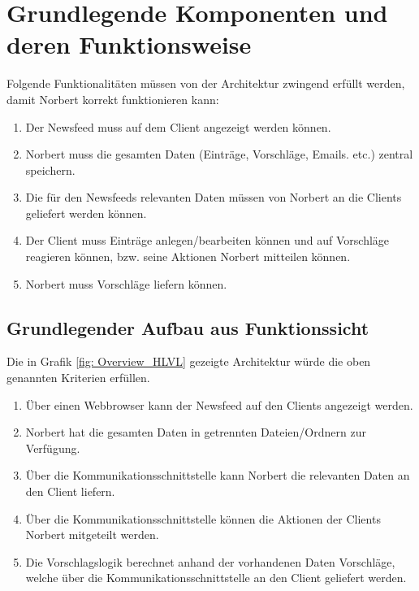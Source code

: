 
\chapter{Grundlegende Komponenten und deren Funktionsweise}

Folgende Funktionalitäten müssen von der Architektur zwingend erfüllt werden, damit Norbert korrekt funktionieren kann:
\begin{enumerate}
	\item Der Newsfeed muss auf dem Client angezeigt werden können.
	\item Norbert muss die gesamten Daten (Einträge, Vorschläge, Emails. etc.) zentral speichern.
	\item Die für den Newsfeeds relevanten Daten müssen von Norbert an die Clients geliefert werden können.
	\item Der Client muss Einträge anlegen/bearbeiten können und auf Vorschläge reagieren können, bzw. seine Aktionen Norbert mitteilen können.
	\item Norbert muss Vorschläge liefern können.
\end{enumerate}
 


\section{Grundlegender Aufbau aus Funktionssicht}


  Die in Grafik \ref{fig: Overview_HLVL} gezeigte Architektur würde die oben genannten Kriterien erfüllen.
  \begin{enumerate}
  	\item Über einen Webbrowser kann der Newsfeed auf den Clients angezeigt werden.
  	\item Norbert hat die gesamten Daten in getrennten Dateien/Ordnern zur Verfügung.
  	\item Über die Kommunikationsschnittstelle kann Norbert die relevanten Daten an den Client liefern.
  	\item Über die Kommunikationsschnittstelle können die Aktionen der Clients Norbert mitgeteilt werden.
  	\item Die Vorschlagslogik berechnet anhand der vorhandenen Daten Vorschläge, welche über die Kommunikationsschnittstelle an den Client geliefert werden.
  	\end{enumerate}

